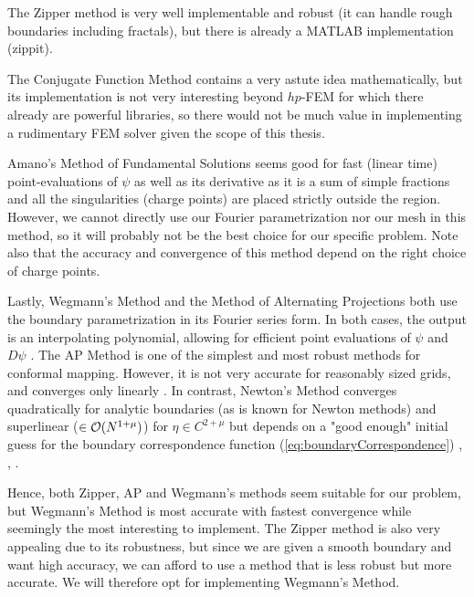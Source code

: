 The Zipper method is very well implementable and robust (it can handle rough boundaries including fractals), but there is already a MATLAB implementation (zippit).

The Conjugate Function Method contains a very astute idea mathematically, but its implementation is not very interesting beyond $hp$-FEM for which there already are powerful libraries, so there would not be much value in implementing a rudimentary FEM solver given the scope of this thesis. 

Amano's Method of Fundamental Solutions seems good for fast (linear time) point-evaluations of $\psi$ as well as its derivative as it is a sum of simple fractions and all the singularities (charge points) are placed strictly outside the region. However, we cannot directly use our Fourier parametrization nor our mesh in this method, so it will probably not be the best choice for our specific problem. Note also that the accuracy and convergence of this method depend on the right choice of charge points.

Lastly, Wegmann's Method and the Method of Alternating Projections both use the boundary parametrization in its Fourier series form.
In both cases, the output is an interpolating polynomial, allowing for efficient point evaluations of $\psi$ and $D\psi$ \cite{Wegmann1984_convergence_iterative_method}.
The AP Method is one of the simplest and most robust methods for conformal mapping. However, it is not very accurate for reasonably sized grids, and converges only linearly \cite[Chapter 4.2]{Wegmann2005_num_methods_confmapping}.
In contrast, Newton's Method converges quadratically for analytic boundaries (as is known for Newton methods) and superlinear ($\in\mathcal{O}(N^{1+\mu})$) for $\eta\in C^{2+\mu}$ but depends on a "good enough" initial guess for the boundary correspondence function (\ref{eq:boundaryCorrespondence}) \cite[§ 4]{Wegmann1978_newtonverfahren}, \cite[page 292]{Wegmann1989_alternating_projections}, \cite{Wegmann1984_convergence_iterative_method}.



Hence, both Zipper, AP and Wegmann's methods seem suitable for our problem, but Wegmann's Method is most accurate with fastest convergence while seemingly the most interesting to implement.
The Zipper method is also very appealing due to its robustness, but since we are given a smooth boundary and want high accuracy, we can afford to use a method that is less robust but more accurate.
We will therefore opt for implementing Wegmann's Method.
\bigskip

